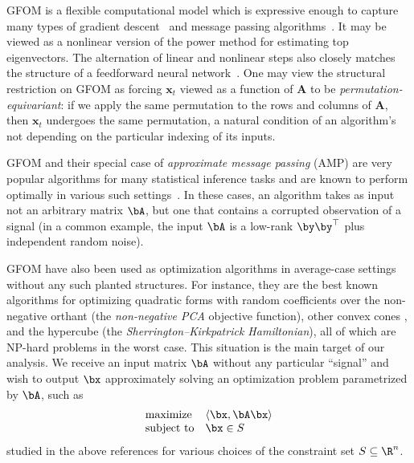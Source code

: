 GFOM is a flexible computational model which is expressive enough to capture many types of gradient descent~\cite{celentano2020estimation, gerbelot2022rigorous} and message passing algorithms~\cite{feng2022unifying}.
It may be viewed as a nonlinear version of the power method for estimating top eigenvectors. The alternation of linear and nonlinear steps also closely matches the structure of a feedforward neural network~\cite{cirone2024graph}.
One may view the structural restriction on GFOM as forcing $\bm x_t$ viewed as a function of $\bm A$ to be \emph{permutation-equivariant}: if we apply the same permutation to the rows and columns of $\bm A$, then $\bm x_t$ undergoes the same permutation, a natural condition of an algorithm's not depending on the particular indexing of its inputs.

GFOM and their special case of \emph{approximate message passing} (AMP) are very popular algorithms for many statistical inference tasks and are known to perform optimally in various such settings~\cite{donoho2009message,rangan2011generalized,montanari2012graphical,rangan2016inference,bayati2011dynamics,feng2022unifying}.
In these cases, an algorithm takes as input not an arbitrary matrix $\bA$, but one that contains a corrupted observation of a signal (in a common example, the input $\bA$ is a low-rank $\by\by^{\top}$ plus independent random noise).

GFOM have also been used as optimization algorithms in average-case settings without any such planted structures.
For instance, they are the best known algorithms for optimizing quadratic forms with random coefficients over the non-negative orthant \cite{MR-2015-NonNegative} (the \emph{non-negative PCA} objective function), other convex cones \cite{DMR-2014-ConePCA}, and the hypercube \cite{montanari2021optimization} (the \emph{Sherrington--Kirkpatrick Hamiltonian}), all of which are NP-hard problems in the worst case.
This situation is the main target of our analysis. We receive an input matrix $\bA$ without any particular ``signal'' and wish to output $\bx$ approximately solving an optimization problem parametrized by $\bA$, such as 
\begin{equation}
\label{eq:quad-opt}
\begin{array}{ll} \text{maximize} & \langle \bx, \bA\bx\rangle \\ \text{subject to} & \bx \in S \end{array}
\end{equation}
studied in the above references for various choices of the constraint set $S \subseteq \R^n$.


